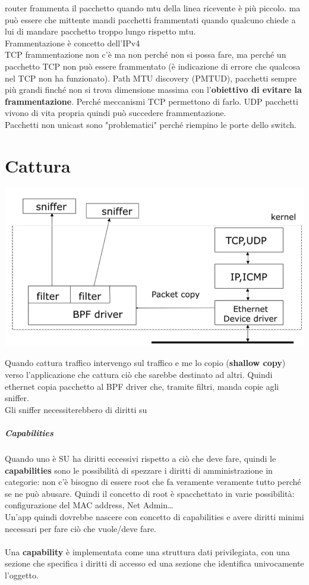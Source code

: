 \documentclass[10pt]{book}
\begin{document}
router frammenta il pacchetto quando mtu della linea ricevente è più piccolo. ma può essere che mittente mandi pacchetti frammentati quando qualcuno chiede a lui di mandare pacchetto troppo lungo rispetto mtu.\\
Frammentazione è concetto dell'IPv4\\
TCP frammentazione non c'è ma non perché non si possa fare, ma perché un pacchetto TCP non può essere frammentato (è indicazione di errore che qualcosa nel TCP non ha funzionato). Path MTU discovery (PMTUD), pacchetti sempre più grandi finché non si trova dimensione massima con l'\textbf{obiettivo di evitare la frammentazione}. Perché meccanismi TCP permettono di farlo. UDP pacchetti vivono di vita propria quindi può succedere frammentazione.\\
Pacchetti non unicast sono "problematici" perché riempino le porte dello switch.

\chapter{Cattura}
\begin{center}
	\includegraphics[scale=0.75]{cattura.png}
\end{center}
Quando cattura traffico intervengo sul traffico e me lo copio (\textbf{shallow copy}) verso l'applicazione che cattura ciò che sarebbe destinato ad altri. Quindi ethernet copia pacchetto al BPF driver che, tramite filtri, manda copie agli sniffer.\\
Gli sniffer necessiterebbero di diritti su
\paragraph{Capabilities} Quando uno è SU ha diritti eccessivi rispetto a ciò che deve fare, quindi le \textbf{capabilities} sono le possibilità di spezzare i diritti di amministrazione in categorie: non c'è bisogno di essere root che fa veramente veramente tutto perché se ne può abusare. Quindi il concetto di root è spacchettato in varie possibilità: configurazione del MAC address, Net Admin\ldots\\
Un'app quindi dovrebbe nascere con concetto di capabilities e avere diritti minimi necessari per fare ciò che vuole/deve fare.\\\\
Una \textbf{capability} è implementata come una struttura dati privilegiata, con una sezione che specifica i diritti di accesso ed una sezione che identifica univocamente l'oggetto.
\end{document}
